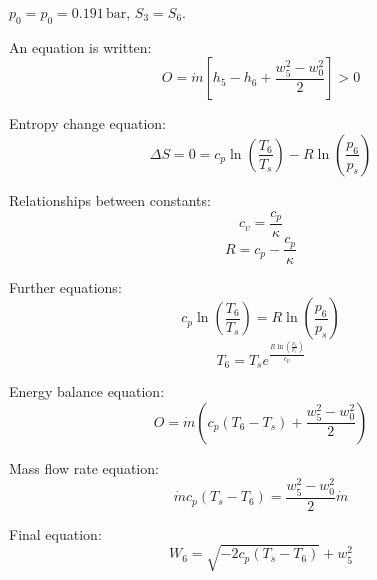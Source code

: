 \( p_0 = p_0 = 0.191 \, \text{bar} \), \( S_3 = S_6 \).  

An equation is written:  
\[
O = \dot{m} \left[ h_5 - h_6 + \frac{w_5^2 - w_0^2}{2} \right] > 0
\]  

Entropy change equation:  
\[
\Delta S = 0 = c_p \ln \left( \frac{T_6}{T_s} \right) - R \ln \left( \frac{p_6}{p_s} \right)
\]  

Relationships between constants:  
\[
c_v = \frac{c_p}{\kappa}
\]  
\[
R = c_p - \frac{c_p}{\kappa}
\]  

Further equations:  
\[
c_p \ln \left( \frac{T_6}{T_s} \right) = R \ln \left( \frac{p_6}{p_s} \right)
\]  
\[
T_6 = T_s e^{\frac{R \ln \left( \frac{p_6}{p_s} \right)}{c_p}}
\]  

Energy balance equation:  
\[
O = \dot{m} \left( c_p (T_6 - T_s) + \frac{w_5^2 - w_0^2}{2} \right)
\]  

Mass flow rate equation:  
\[
\dot{m} c_p (T_s - T_6) = \frac{w_5^2 - w_0^2}{2} \dot{m}
\]  

Final equation:  
\[
W_6 = \sqrt{-2 c_p (T_s - T_6)} + w_5^2
\]